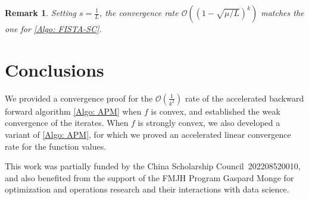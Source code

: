 \documentclass[pdflatex,sn-mathphys-num]{sn-jnl}
\theoremstyle{thmstyleone}
\theoremstyle{thmstyletwo}
\newtheorem{remark}{Remark}
\theoremstyle{thmstylethree}
\newenvironment{acknowledgements}{\begin{acknowledgement}}
{\end{acknowledgement}}
\begin{document}
\begin{remark}
Setting $s=\frac{1}{L}$, the convergence rate $\mathcal{O}\left( (1-\sqrt{\mu/L})^{k} \right)$ matches the one for \eqref{Algo: FISTA-SC}. 
\end{remark}




\section{Conclusions}\label{Sec: conclusions}
We provided a convergence proof for the $\mathcal{O}\left( \frac{1}{k^2} \right)$ rate of the accelerated backward forward algorithm \eqref{Algo: APM} when $f$ is convex, and established the weak convergence of the iterates. When $f$ is strongly convex, we also developed a variant of \eqref{Algo: APM}, for which we proved an accelerated linear convergence rate for the function values.










\begin{acknowledgements}
This work was partially funded by the China Scholarship Council~202208520010, and also benefited from the support of the FMJH Program Gaspard Monge for optimization and operations research and their interactions with data science.
\end{acknowledgements}





\end{document}
